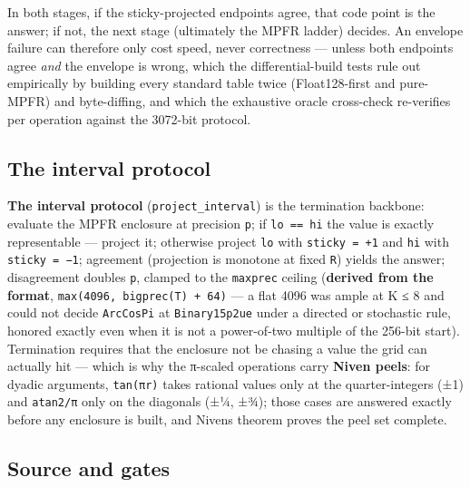 In both stages, if the sticky-projected endpoints agree, that code point is the answer; if not, the next stage (ultimately the MPFR ladder) decides. An envelope failure can therefore only cost speed, never correctness — unless both endpoints agree \emph{and} the envelope is wrong, which the differential-build tests rule out empirically by building every standard table twice (Float128-first and pure-MPFR) and byte-diffing, and which the exhaustive oracle cross-check re-verifies per operation against the 3072-bit protocol.



\subsection{The interval protocol}



\label{13833006351776399793}{}


\textbf{The interval protocol} (\texttt{project\_\allowbreak{}interval}) is the termination backbone: evaluate the MPFR enclosure at precision \texttt{p}; if \texttt{lo == hi} the value is exactly representable — project it; otherwise project \texttt{lo} with \texttt{sticky = +1} and \texttt{hi} with \texttt{sticky = −1}; agreement (projection is monotone at fixed \texttt{R}) yields the answer; disagreement doubles \texttt{p}, clamped to the \texttt{maxprec} ceiling (\textbf{derived from the format}, \texttt{max(\allowbreak{}4096, bigprec(\allowbreak{}T) + 64)} — a flat 4096 was ample at K ≤ 8 and could not decide \texttt{ArcCosPi} at \texttt{Binary15p2ue} under a directed or stochastic rule, honored exactly even when it is not a power-of-two multiple of the 256-bit start). Termination requires that the enclosure not be chasing a value the grid can actually hit — which is why the π-scaled operations carry \textbf{Niven peels}: for dyadic arguments, \texttt{tan(πr)} takes rational values only at the quarter-integers (±1) and \texttt{atan2/π} only on the diagonals (±¼, ±¾); those cases are answered exactly before any enclosure is built, and Niven{\textquotesingle}s theorem proves the peel set complete.



\subsection{Source and gates}



\label{13106405904108779198}{}


